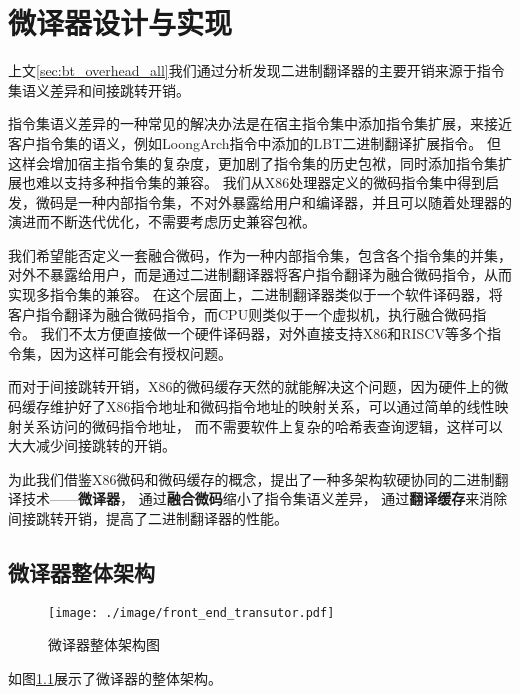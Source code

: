 \chapter{微译器设计与实现}\label{chap:MUT}

上文\ref{sec:bt_overhead_all}我们通过分析发现二进制翻译器的主要开销来源于指令集语义差异和间接跳转开销。

指令集语义差异的一种常见的解决办法是在宿主指令集中添加指令集扩展，来接近客户指令集的语义，例如LoongArch指令中添加的LBT二进制翻译扩展指令。
但这样会增加宿主指令集的复杂度，更加剧了指令集的历史包袱，同时添加指令集扩展也难以支持多种指令集的兼容。
我们从X86处理器定义的微码指令集中得到启发，微码是一种内部指令集，不对外暴露给用户和编译器，并且可以随着处理器的演进而不断迭代优化，不需要考虑历史兼容包袱。

我们希望能否定义一套融合微码，作为一种内部指令集，包含各个指令集的并集，对外不暴露给用户，而是通过二进制翻译器将客户指令翻译为融合微码指令，从而实现多指令集的兼容。
在这个层面上，二进制翻译器类似于一个软件译码器，将客户指令翻译为融合微码指令，而CPU则类似于一个虚拟机，执行融合微码指令。
我们不太方便直接做一个硬件译码器，对外直接支持X86和RISCV等多个指令集，因为这样可能会有授权问题。

而对于间接跳转开销，X86的微码缓存天然的就能解决这个问题，因为硬件上的微码缓存维护好了X86指令地址和微码指令地址的映射关系，可以通过简单的线性映射关系访问的微码指令地址，
而不需要软件上复杂的哈希表查询逻辑，这样可以大大减少间接跳转的开销。

为此我们借鉴X86微码和微码缓存的概念，提出了一种多架构软硬协同的二进制翻译技术——\textbf{微译器}，
通过\textbf{融合微码}缩小了指令集语义差异，
通过\textbf{翻译缓存}来消除间接跳转开销，提高了二进制翻译器的性能。

\section{微译器整体架构}

\begin{figure}[h]
  \centering
  \texttt{[image: ./image/front\_end\_transutor.pdf]}
  \caption{微译器整体架构图}
  \label{img:front_end_transutor}
\end{figure}

如图\ref{img:front_end_transutor}展示了微译器的整体架构。


